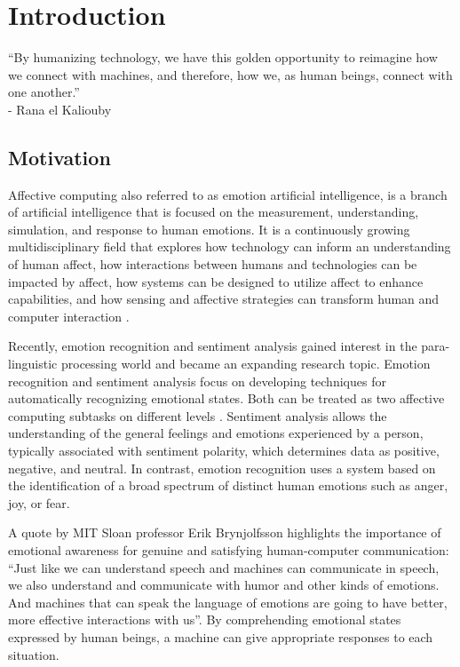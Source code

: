 \chapter{Introduction}
\label{chapter:introduction}

\begin{introduction}
	“By humanizing technology, we have this golden opportunity to reimagine how we connect with machines, and therefore, how we, as human beings, connect with one another.”\\- Rana el Kaliouby \cite{ranaTedTalk}
\end{introduction}

\section{Motivation}

Affective computing also referred to as emotion artificial intelligence, is a branch of artificial intelligence that is focused on the measurement, understanding, simulation, and response to human emotions. It is a continuously growing multidisciplinary field that explores how technology can inform an understanding of human affect, how interactions between humans and technologies can be impacted by affect, how systems can be designed to utilize affect to enhance capabilities, and how sensing and affective strategies can transform human and computer interaction \cite{Daily2017}. 

Recently, emotion recognition and sentiment analysis gained interest in the para-linguistic processing world and became an expanding research topic. Emotion recognition and sentiment analysis focus on developing techniques for automatically recognizing emotional states. Both can be treated as two affective computing subtasks on different levels \cite{PORIA201798}. Sentiment analysis allows the understanding of the general feelings and emotions experienced by a person, typically associated with sentiment polarity, which determines data as positive, negative, and neutral. In contrast, emotion recognition uses a system based on the identification of a broad spectrum of distinct human emotions such as anger, joy, or fear.

A quote by MIT Sloan professor Erik Brynjolfsson highlights the importance of emotional awareness for genuine and satisfying human-computer communication: “Just like we can understand speech and machines can communicate in speech, we also understand and communicate with humor and other kinds of emotions. And machines that can speak the language of emotions are going to have better, more effective interactions with us”. By comprehending emotional states expressed by human beings, a machine can give appropriate responses to each situation.

